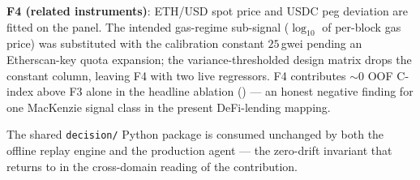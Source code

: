 \textbf{F4 (related instruments)}: ETH/USD spot price and
USDC peg deviation are fitted on the panel.  The intended gas-regime
sub-signal ($\log_{10}$ of per-block gas price) was substituted with
the calibration constant $25$\,gwei pending an Etherscan-key quota
expansion; the variance-thresholded design matrix drops the constant
column, leaving F4 with two live regressors.  F4 contributes $\sim 0$
OOF C-index above F3 alone in the headline ablation ()
--- an honest negative finding for one MacKenzie signal class in
the present DeFi-lending mapping.

The shared \texttt{decision/} Python package is consumed unchanged
by both the offline replay engine and the production agent --- the
zero-drift invariant that  returns to in the
cross-domain reading of the contribution.
